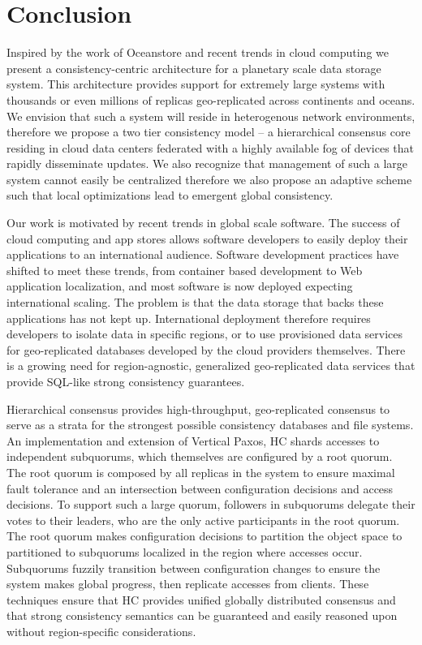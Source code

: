 
\renewcommand{\thechapter}{8}

\chapter{Conclusion}
\label{ch:conclusion}

Inspired by the work of Oceanstore and recent trends in cloud computing we present a consistency-centric architecture for a planetary scale data storage system.
This architecture provides support for extremely large systems with thousands or even millions of replicas geo-replicated across continents and oceans.
We envision that such a system will reside in heterogenous network environments, therefore we propose a two tier consistency model -- a hierarchical consensus core residing in cloud data centers federated with a highly available fog of devices that rapidly disseminate updates.
We also recognize that management of such a large system cannot easily be centralized therefore we also propose an adaptive scheme such that local optimizations lead to emergent global consistency.

Our work is motivated by recent trends in global scale software.
The success of cloud computing and app stores allows software developers to easily deploy their applications to an international audience.
Software development practices have shifted to meet these trends, from container based development to Web application localization, and most software is now deployed expecting international scaling.
The problem is that the data storage that backs these applications has not kept up.
International deployment therefore requires developers to isolate data in specific regions, or to use provisioned data services for geo-replicated databases developed by the cloud providers themselves.
There is a growing need for region-agnostic, generalized geo-replicated data services that provide SQL-like strong consistency guarantees.

Hierarchical consensus provides high-throughput, geo-replicated consensus to serve as a strata for the strongest possible consistency databases and file systems.
An implementation and extension of Vertical Paxos, HC shards accesses to independent subquorums, which themselves are configured by a root quorum.
The root quorum is composed by all replicas in the system to ensure maximal fault tolerance and an intersection between configuration decisions and access decisions.
To support such a large quorum, followers in subquorums delegate their votes to their leaders, who are the only active participants in the root quorum.
The root quorum makes configuration decisions to partition the object space to partitioned to subquorums localized in the region where accesses occur.
Subquorums fuzzily transition between configuration changes to ensure the system makes global progress, then replicate accesses from clients.
These techniques ensure that HC provides unified globally distributed consensus and that strong consistency semantics can be guaranteed and easily reasoned upon without region-specific considerations.

